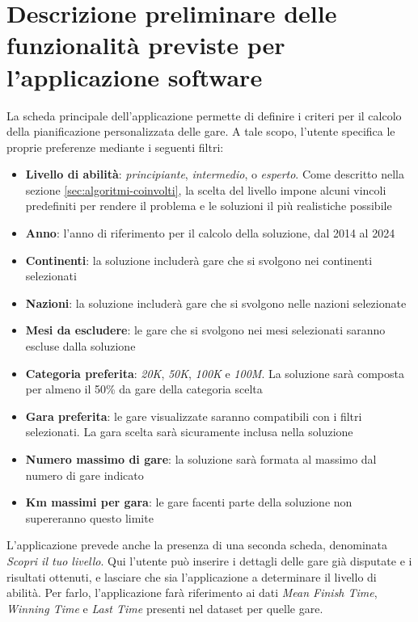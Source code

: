 \documentclass[a4paper, 12pt, oneside]{book}
\begin{document}
\section{Descrizione preliminare delle funzionalità previste per l’applicazione software}
La scheda principale dell'applicazione permette di definire i criteri per il calcolo della pianificazione personalizzata delle gare. A tale scopo, l'utente specifica le proprie preferenze mediante i seguenti filtri:
\begin{itemize}
    \item \textbf{Livello di abilità}: \textit{principiante}, \textit{intermedio}, o \textit{esperto}. Come descritto nella sezione \ref{sec:algoritmi-coinvolti}, la scelta del livello impone alcuni vincoli predefiniti per rendere il problema e le soluzioni il più realistiche possibile
    \item \textbf{Anno}: l'anno di riferimento per il calcolo della soluzione, dal 2014 al 2024
    \item \textbf{Continenti}: la soluzione includerà gare che si svolgono nei continenti selezionati
    \item \textbf{Nazioni}: la soluzione includerà gare che si svolgono nelle nazioni selezionate
    \item \textbf{Mesi da escludere}: le gare che si svolgono nei mesi selezionati saranno escluse dalla soluzione
    \item \textbf{Categoria preferita}: \textit{20K}, \textit{50K}, \textit{100K} e \textit{100M}. La soluzione sarà composta per almeno il 50\% da gare della categoria scelta
    \item \textbf{Gara preferita}: le gare visualizzate saranno compatibili con i filtri selezionati. La gara scelta sarà sicuramente inclusa nella soluzione
    \item \textbf{Numero massimo di gare}: la soluzione sarà formata al massimo dal numero di gare indicato
    \item \textbf{Km massimi per gara}: le gare facenti parte della soluzione non supereranno questo limite
\end{itemize}
L'applicazione prevede anche la presenza di una seconda scheda, denominata \textit{Scopri il tuo livello}. Qui l'utente può inserire i dettagli delle gare già disputate e i risultati ottenuti, e lasciare che sia l'applicazione a determinare il livello di abilità. Per farlo, l'applicazione farà riferimento ai dati \textit{Mean Finish Time}, \textit{Winning Time} e \textit{Last Time} presenti nel dataset per quelle gare.
\end{document}
